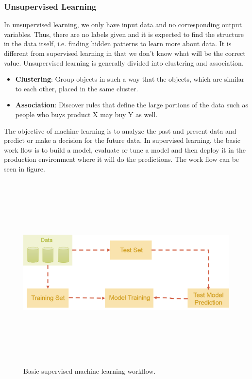\subsubsection{Unsupervised Learning}

In unsupervised learning, we only have input data and no corresponding output variables. Thus, there are no labels given and it is expected to find the structure in the data itself, i.e. finding hidden patterns to learn more about data. It is different from supervised learning in that we don't know what will be the correct value. Unsupervised learning is generally divided into clustering and association.

\begin{itemize}
	\item \textbf{Clustering}: Group objects in such a way that the objects, which are similar to each other, placed in the same cluster.
	\item \textbf{Association}: Discover rules that define the large portions of the data such as people who buys product X may buy Y as well.
\end{itemize}

The objective of machine learning is to analyze the past and present data and predict or make a decision for the future data. In supervised learning, the basic work flow is to build a model, evaluate or tune a model and then deploy it in the production environment where it will do the predictions. The work flow can be seen in figure.


\begin{figure}[htpb]
	\centering
	\includegraphics[width=12cm,height=10cm,keepaspectratio=true]{images/basic-ml-model.png}
	\caption{
		Basic supervised machine learning workflow.
	}
	\label{fig:basic-ml-model}
\end{figure}


